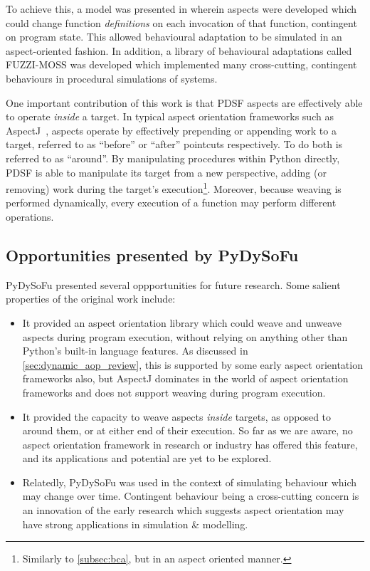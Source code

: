 To achieve this, a model was presented in \cite{wallis2018caise} wherein aspects
were developed which could change function \emph{definitions} on each invocation
of that function, contingent on program state. This allowed behavioural
adaptation to be simulated in an aspect-oriented fashion. In addition, a library
of behavioural adaptations called FUZZI-MOSS was developed
which implemented many cross-cutting, contingent behaviours in procedural
simulations of \sociotechnical systems.

One important contribution of this work is that PDSF aspects are effectively
able to operate \emph{inside} a target. In typical aspect orientation frameworks
such as AspectJ~\cite{aspectj_intro}, aspects operate by effectively prepending
or appending work to a target, referred to as ``before'' or ``after'' pointcuts
respectively. To do both is referred to as ``around''. By manipulating
procedures within Python directly, PDSF is able to manipulate its target from a
new perspective, adding (or removing) work during the target's
execution\footnote{Similarly to \cref{subsec:bca}, but in an aspect oriented
manner.}. Moreover, because weaving is performed dynamically, every execution of
a function may perform different operations.

\subsection{Opportunities presented by PyDySoFu}

PyDySoFu presented several oppportunities for future research. Some salient
properties of the original work include:

\begin{itemize}
    \item It provided an aspect orientation library which could weave and
    unweave aspects during program execution, without relying on anything other
    than Python's built-in language features. As discussed in
    \cref{sec:dynamic_aop_review}, this is supported by some early aspect
    orientation frameworks also, but AspectJ dominates in the world of aspect
    orientation frameworks and does not support weaving during program execution.
    \item It provided the capacity to weave aspects \emph{inside} targets, as
    opposed to around them, or at either end of their execution. So far as we
    are aware, no aspect orientation framework in research or industry has
    offered this feature, and its applications and potential are yet to be
    explored.
    \item Relatedly, PyDySoFu was used in the context of simulating behaviour which may change
    over time. Contingent behaviour being a cross-cutting concern is an
    innovation of the early research which suggests aspect orientation may have
    strong applications in \sociotechnical simulation \& modelling.
\end{itemize}

